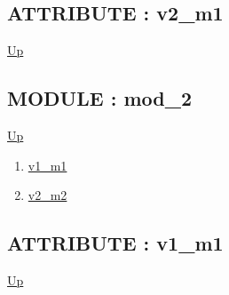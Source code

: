 \subsection*{ATTRIBUTE : v2\_m1}
\hypertarget{ecldoc:intest.example_2.mod_1.v2_m1}{}
\par
\begin{minipage}[t]{\textwidth}
\begin{flushleft}
  
\end{flushleft}
\end{minipage}
\hyperlink{ecldoc:intest.example_2.mod_1}{Up} \\
\par
\par

\subsection*{MODULE : mod\_2}
\hypertarget{ecldoc:intest.example_2.mod_2}{}
\par
\begin{minipage}[t]{\textwidth}
\begin{flushleft}
  
\end{flushleft}
\end{minipage}
\hyperlink{ecldoc:intest.example_2}{Up} \\
\par
\par
\begin{enumerate}
\item \hyperlink{ecldoc:intest.example_2.mod_2.v1_m1}{v1\_m1}
\item \hyperlink{ecldoc:intest.example_2.mod_2.v2_m2}{v2\_m2}
\end{enumerate}
\subsection*{ATTRIBUTE : v1\_m1}
\hypertarget{ecldoc:intest.example_2.mod_2.v1_m1}{}
\par
\begin{minipage}[t]{\textwidth}
\begin{flushleft}
  
\end{flushleft}
\end{minipage}
\hyperlink{ecldoc:intest.example_2.mod_2}{Up} \\
\par
\par
